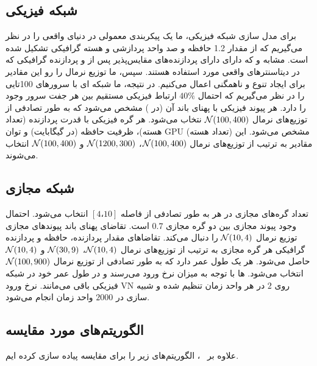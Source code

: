 \subsection{شبکه فیزیکی}
برای مدل سازی شبکه فیزیکی، ما یک پیکربندی معمولی در دنیای واقعی را در نظر می‌گیریم که از مقدار 1.2 حافظه و صد واحد پردازشی و هسته گرافیکی تشکیل شده است.
 مشابه 
 و 
که دارای دارای پردازنده‌های مقایس‌پذیر پس از 
 و  پردازنده گرافیکی 
 که در دیتاسنتر‌های واقعی مورد استفاده هستند. 
  سپس‌، ما توزیع نرمال را رو این مقادیر برای ایجاد تنوع و ناهمگنی اعمال می‌کنیم. در نتیجه‌، ما شبکه ای با سرورهای 100تایی را در نظر می‌گیریم که احتمال $40\%$  ارتباط فیزیکی مستقیم بین هر جفت سرور وجود را دارد. هر پیوند فیزیکی با پهنای باند آن (در ) مشخص می‌شود که به طور تصادفی از توزیع‌های نرمال $\mathcal{N}(100, 400)$ نتخاب می‌شود. هر گره فیزیکی با قدرت پردازنده (تعداد هسته)‌، ظرفیت حافظه (در گیگابایت) و توان GPU (تعداد هسته) مشخص می‌شود. این مقادیر به ترتیب از توزیع‌های نرمال $\mathcal{N}(100, 400)$‌، $\mathcal{N}(1200, 300)$ و $\mathcal{N}(100, 400)$ انتخاب می‌شوند.
  
  \subsection{شبکه مجازی}
  	تعداد گره‌های مجازی در هر  به طور تصادفی از فاصله $ [4‌، 10] $ انتخاب می‌شود. احتمال وجود پیوند مجازی بین دو گره مجازی $0.7$ است. تقاضای پهنای باند پیوندهای مجازی توزیع نرمال $\mathcal{N}(10, 4)$ را دنبال می‌کند. تقاضاهای مقدار پردازنده‌، حافظه و پردازنده گرافیکی هر گره مجازی به ترتیب از توزیع‌های نرمال $\mathcal{N}(10, 4)$‌، $\mathcal{N}(30, 9)$ و $\mathcal{N}(10, 4)$ حاصل می‌شود. هر  یک طول عمر دارد که به طور تصادفی از توزیع نرمال $\mathcal{N}(100, 900)$ انتخاب می‌شود. ‌ها با توجه به میزان نرخ ورود می‌رسند و در طول عمر خود در شبکه فیزیکی باقی می‌مانند. نرخ ورود VN روی $ 2$ در هر واحد زمان تنظیم شده و شبیه سازی در $ 2000 $ واحد زمان انجام می‌شود.
  	
  	\subsection{الگوریتم‌های مورد مقایسه}
  	علاوه بر  \ourAlg\ ، الگوریتم‌های زیر را برای مقایسه پیاده سازی کرده ایم.
  	
